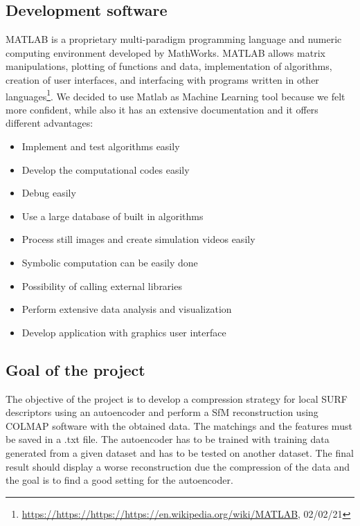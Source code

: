 \subsection{Development software}
MATLAB is a proprietary multi-paradigm programming language and numeric computing environment developed by MathWorks. MATLAB allows matrix manipulations, plotting of functions and data, implementation of algorithms, creation of user interfaces, and interfacing with programs written in other languages\footnote{\url{https://https://https://https://en.wikipedia.org/wiki/MATLAB}, 02/02/21}. We decided to use Matlab as Machine Learning tool because we felt more confident, while also it has an extensive documentation and it offers different advantages:
\begin{itemize}
\item Implement and test algorithms easily
\item Develop the computational codes easily
\item Debug easily
\item Use a large database of built in algorithms
\item Process still images and create simulation videos easily
\item Symbolic computation can be easily done
\item Possibility of calling external libraries
\item Perform extensive data analysis and visualization
\item Develop application with graphics user interface
\end{itemize}


\subsection{Goal of the project}
The objective of the project is to develop a compression strategy for local SURF descriptors using an autoencoder and perform a SfM reconstruction using COLMAP software with the obtained data. The matchings and the features must be saved in a .txt file. The autoencoder has to be trained with training data generated from a given dataset and has to be tested on another dataset. The final result should display a worse reconstruction due the compression of the data and the goal is to find a good setting for the autoencoder. 